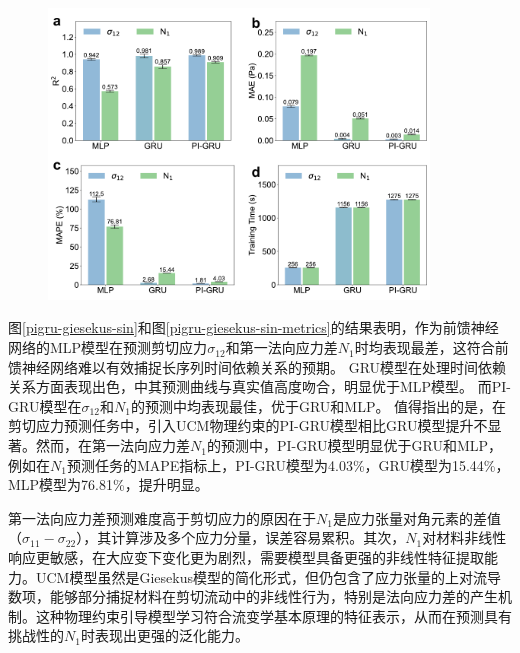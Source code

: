\begin{figure}
  \centering
  \includegraphics[width=0.9\textwidth]{Fig/pigru-giesekus-sin-metrics.pdf}
\end{figure}
图\ref{pigru-giesekus-sin}和图\ref{pigru-giesekus-sin-metrics}的结果表明，作为前馈神经网络的MLP模型在预测剪切应力$\sigma_{12}$和第一法向应力差$N_1$时均表现最差，这符合前馈神经网络难以有效捕捉长序列时间依赖关系的预期。
GRU模型在处理时间依赖关系方面表现出色，中其预测曲线与真实值高度吻合，明显优于MLP模型。
而PI-GRU模型在$\sigma_{12}$和$N_1$的预测中均表现最佳，优于GRU和MLP。
值得指出的是，在剪切应力预测任务中，引入UCM物理约束的PI-GRU模型相比GRU模型提升不显著。然而，在第一法向应力差$N_1$的预测中，PI-GRU模型明显优于GRU和MLP，例如在$N_1$预测任务的MAPE指标上，PI-GRU模型为4.03\%，GRU模型为15.44\%，MLP模型为76.81\%，提升明显。

第一法向应力差预测难度高于剪切应力的原因在于$N_1$是应力张量对角元素的差值（$\sigma_{11}-\sigma_{22}$），其计算涉及多个应力分量，误差容易累积。其次，$N_1$对材料非线性响应更敏感，在大应变下变化更为剧烈，需要模型具备更强的非线性特征提取能力。UCM模型虽然是Giesekus模型的简化形式，但仍包含了应力张量的上对流导数项，能够部分捕捉材料在剪切流动中的非线性行为，特别是法向应力差的产生机制。这种物理约束引导模型学习符合流变学基本原理的特征表示，从而在预测具有挑战性的$N_1$时表现出更强的泛化能力。

